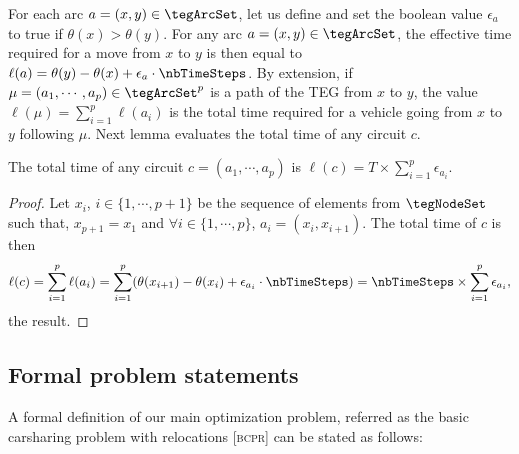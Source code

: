 \begin{bibunit}[ieeetr]
For each arc $a=(x,y)\in \tegArcSet$, let us define and set the boolean value $\epsilon_a$ to true if  $\theta(x)>\theta(y)$.
For any arc $a=(x,y)\in \tegArcSet$, the effective time required for a move from  $x$ to $y$ is then equal to 
$\ell(a)=\theta(y)-\theta(x)+\epsilon_a \cdot\nbTimeSteps$.
By extension, if $\mu= (a_1, \cdots, a_p) \in \tegArcSet^p$ is a path of the TEG from $x$ to $y$, the value
$\ell(\mu)=\sum_{i=1}^p \ell(a_i)$ is the total time required for a vehicle going from $x$ to
$y$ following $\mu$.
Next lemma evaluates the total time of any circuit $c$.
\begin{lemma} \label{timecircuit}
The total time of any circuit $c=(a_1,\cdots, a_p)$ is $\ell(c)=T\times \sum\limits_{i=1}^p \epsilon_{a_i}$.
\end{lemma}
\begin{proof}
Let $x_i$, $i\in \{1,\cdots, p+1\}$ be the sequence of elements from $\tegNodeSet$ such that, $x_{p+1}=x_1$ and
$\forall i\in\{1,\cdots, p\}$, $a_i=(x_i, x_{i+1})$.
The total time of $c$ is then
\[\ell(c)=\sum_{i=1}^p \ell(a_i) = \sum_{i=1}^p ( \theta(x_{i+1})- \theta(x_{i}) +\epsilon_{a_i} \cdot\nbTimeSteps) =\nbTimeSteps\times \sum_{i=1}^p \epsilon_{a_i},\]
the result.
\end{proof}

%

\subsection{Formal problem statements}
A formal definition of our main optimization problem, referred as  the basic carsharing problem with relocations [\textsc{bcpr}] can be stated as follows:


\end{bibunit}
